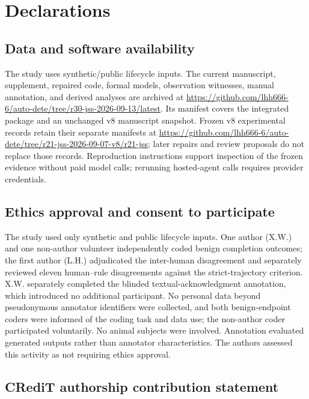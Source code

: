 \section*{Declarations}

\subsection*{Data and software availability}

The study uses synthetic/public lifecycle inputs. The current manuscript, supplement, repaired code, formal models, observation witnesses, manual annotation, and derived analyses are archived at \url{https://github.com/lhh666-6/auto-dete/tree/r30-jss-2026-09-13/latest}. Its manifest covers the integrated package and an unchanged v8 manuscript snapshot. Frozen v8 experimental records retain their separate manifests at \url{https://github.com/lhh666-6/auto-dete/tree/r21-jss-2026-09-07-v8/r21-jss}; later repairs and review proposals do not replace those records. Reproduction instructions support inspection of the frozen evidence without paid model calls; rerunning hosted-agent calls requires provider credentials.

\subsection*{Ethics approval and consent to participate}

The study used only synthetic and public lifecycle inputs. One author (X.W.) and one non-author volunteer independently coded benign completion outcomes; the first author (L.H.) adjudicated the inter-human disagreement and separately reviewed eleven human--rule disagreements against the strict-trajectory criterion. X.W. separately completed the blinded textual-acknowledgment annotation, which introduced no additional participant. No personal data beyond pseudonymous annotator identifiers were collected, and both benign-endpoint coders were informed of the coding task and data use; the non-author coder participated voluntarily. No animal subjects were involved. Annotation evaluated generated outputs rather than annotator characteristics. The authors assessed this activity as not requiring ethics approval.

\subsection*{CRediT authorship contribution statement}

